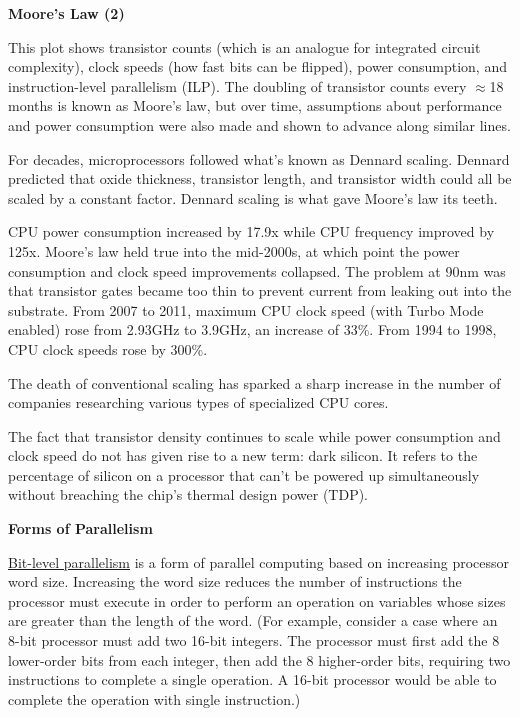 \documentclass[12pt]{article}
\begin{document}
\vspace*{2em}
\noindent \textbf{Moore's Law (2)}

This plot shows transistor counts (which is an analogue for integrated circuit complexity), clock speeds (how fast bits can be flipped), power consumption, and instruction-level parallelism (ILP). The doubling of transistor counts every $\approx$18 months is known as Moore's law, but over time, assumptions about performance and power consumption were also made and shown to advance along similar lines. %

For decades, microprocessors followed what's known as Dennard scaling. Dennard predicted that oxide thickness, transistor length, and transistor width could all be scaled by a constant factor. Dennard scaling is what gave Moore's law its teeth.%

CPU power consumption increased by 17.9x while CPU frequency improved by 125x. Moore's law held true into the mid-2000s, at which point the power consumption and clock speed improvements collapsed. The problem at 90nm was that transistor gates became too thin to prevent current from leaking out into the substrate. From 2007 to 2011, maximum CPU clock speed (with Turbo Mode enabled) rose from 2.93GHz to 3.9GHz, an increase of 33\%. From 1994 to 1998, CPU clock speeds rose by 300\%.

The death of conventional scaling has sparked a sharp increase in the number of companies researching various types of specialized CPU cores.

The fact that transistor density continues to scale while power consumption and clock speed do not has given rise to a new term: dark silicon. It refers to the percentage of silicon on a processor that can’t be powered up simultaneously without breaching the chip's thermal design power (TDP). 


\vspace*{2em}
\noindent \textbf{Forms of Parallelism}

\underline{Bit-level parallelism} is a form of parallel computing based on increasing processor word size. Increasing the word size reduces the number of instructions the processor must execute in order to perform an operation on variables whose sizes are greater than the length of the word. (For example, consider a case where an 8-bit processor must add two 16-bit integers. The processor must first add the 8 lower-order bits from each integer, then add the 8 higher-order bits, requiring two instructions to complete a single operation. A 16-bit processor would be able to complete the operation with single instruction.)
\end{document}
